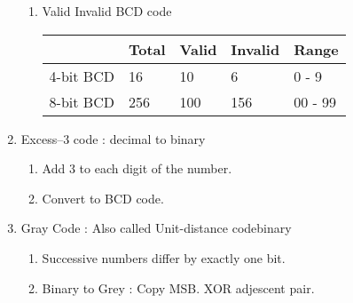\begin{enumerate}
\begin{enumerate}
    \item Valid Invalid BCD code \\
    \begin{myTableStyle} \begin{tabular}{ |m{2cm}|m{2cm}|m{2cm}|m{2cm}|m{2cm}| } \hline
                    & Total     & Valid & Invalid   & Range     \\ \hline
        4-bit BCD   &   16      & 10    & 6         & 0 - 9     \\ \hline
        8-bit BCD   &   256     & 100   & 156       & 00 - 99   \\ \hline
    \end{tabular} \end{myTableStyle} \vspace{0.08in}

    \end{enumerate}

    \item Excess–3 code : decimal to binary
    \begin{enumerate}
        \item Add 3 to each digit of the number.
        \item Convert to BCD code.
    \end{enumerate}

    \item Gray Code : Also called Unit-distance codebinary
    \begin{enumerate}
        \item Successive numbers differ by exactly one bit.
        \item Binary to Grey : Copy MSB. XOR adjescent pair.
    \end{enumerate}

    \begin{center} 
\end{center}
\end{enumerate}

